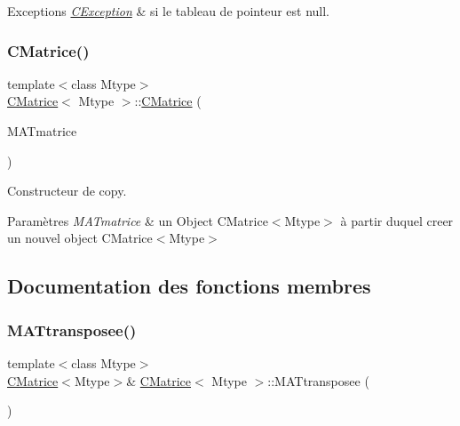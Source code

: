 \begin{DoxyExceptions}{Exceptions}
{\em \hyperlink{classCException}{C\+Exception}} & si le tableau de pointeur est null. \\
\hline
\end{DoxyExceptions}
\mbox{\label{classCMatrice_a2585d9a704eb518ba0b500bc0b5b978a}} 
\subsubsection{\texorpdfstring{C\+Matrice()}{CMatrice()}\hspace{0.1cm}{\footnotesize\ttfamily [2/2]}}
{\footnotesize\ttfamily template$<$class Mtype$>$ \\
\hyperlink{classCMatrice}{C\+Matrice}$<$ Mtype $>$\+::\hyperlink{classCMatrice}{C\+Matrice} (\begin{DoxyParamCaption}\item[{\hyperlink{classCMatrice}{C\+Matrice}$<$ Mtype $>$ \&}]{M\+A\+Tmatrice }\end{DoxyParamCaption})\hspace{0.3cm}{\ttfamily [inline]}}



Constructeur de copy. 


\begin{DoxyParams}{Paramètres}
{\em M\+A\+Tmatrice} & un Object C\+Matrice$<$\+Mtype$>$ à partir duquel creer un nouvel object C\+Matrice$<$\+Mtype$>$ \\
\hline
\end{DoxyParams}


\subsection{Documentation des fonctions membres}
\mbox{\label{classCMatrice_a0beb5a380bc021fa6abc352fc3d032b7}} 
\subsubsection{\texorpdfstring{M\+A\+Ttransposee()}{MATtransposee()}}
{\footnotesize\ttfamily template$<$class Mtype$>$ \\
\hyperlink{classCMatrice}{C\+Matrice}$<$Mtype$>$\& \hyperlink{classCMatrice}{C\+Matrice}$<$ Mtype $>$\+::M\+A\+Ttransposee (\begin{DoxyParamCaption}{ }\end{DoxyParamCaption})\hspace{0.3cm}{\ttfamily [inline]}}



